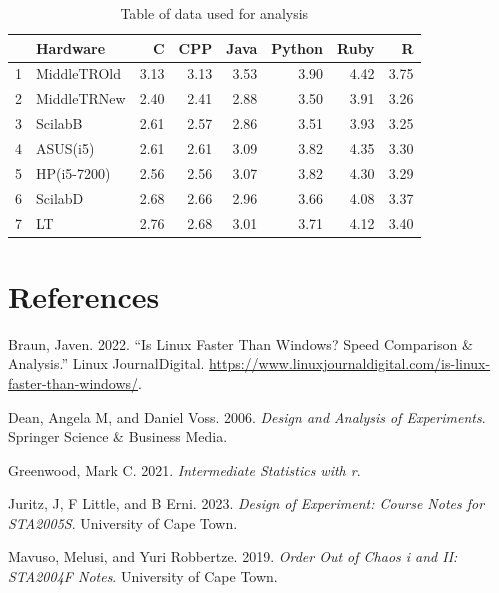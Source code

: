 \documentclass[12pt,halfline,a4paper,]{ouparticle}
\newlength{\cslhangindent}
\newlength{\cslentryspacingunit} %
\newenvironment{CSLReferences}[2] %
 {%
  \setlength{\parindent}{0pt}
  \ifodd #1
  \let\oldpar\par
  \def\par{\hangindent=\cslhangindent\oldpar}
  \fi
  \setlength{\parskip}{#2\cslentryspacingunit}
 }%
 {}
\begin{document}
\begin{table}[ht]
\centering
\begin{tabular}{rlrrrrrr}
  \hline
 & Hardware & C & CPP & Java & Python & Ruby & R \\ 
  \hline
1 & MiddleTROld & 3.13 & 3.13 & 3.53 & 3.90 & 4.42 & 3.75 \\ 
  2 & MiddleTRNew & 2.40 & 2.41 & 2.88 & 3.50 & 3.91 & 3.26 \\ 
  3 & ScilabB & 2.61 & 2.57 & 2.86 & 3.51 & 3.93 & 3.25 \\ 
  4 & ASUS(i5) & 2.61 & 2.61 & 3.09 & 3.82 & 4.35 & 3.30 \\ 
  5 & HP(i5-7200) & 2.56 & 2.56 & 3.07 & 3.82 & 4.30 & 3.29 \\ 
  6 & ScilabD & 2.68 & 2.66 & 2.96 & 3.66 & 4.08 & 3.37 \\ 
  7 & LT & 2.76 & 2.68 & 3.01 & 3.71 & 4.12 & 3.40 \\ 
   \hline
\end{tabular}
\caption{Table of data used for analysis} 
\end{table}

\newpage

\hypertarget{references}{%
\section*{References}\label{references}}

\hypertarget{refs}{}
\begin{CSLReferences}{1}{0}
\leavevmode{}%
Braun, Javen. 2022. {``Is Linux Faster Than Windows? Speed Comparison \&
Analysis.''} Linux JournalDigital.
\url{https://www.linuxjournaldigital.com/is-linux-faster-than-windows/}.

\leavevmode{}%
Dean, Angela M, and Daniel Voss. 2006. \emph{Design and Analysis of
Experiments}. Springer Science \& Business Media.

\leavevmode{}%
Greenwood, Mark C. 2021. \emph{Intermediate Statistics with r}.

\leavevmode{}%
Juritz, J, F Little, and B Erni. 2023. \emph{Design of Experiment:
Course Notes for STA2005S}. University of Cape Town.

\leavevmode{}%
Mavuso, Melusi, and Yuri Robbertze. 2019. \emph{Order Out of Chaos i and
II: STA2004F Notes}. University of Cape Town.

\end{CSLReferences}
\end{document}

